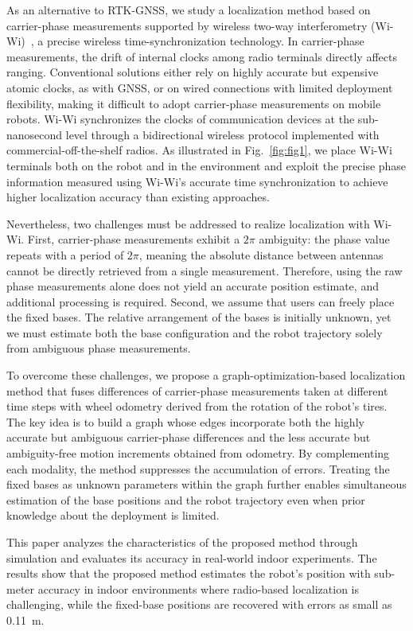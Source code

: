 \documentclass[conference]{IEEEtran}
\begin{document}
As an alternative to RTK-GNSS, we study a localization method based on carrier-phase measurements supported by wireless two-way interferometry (Wi-Wi)~\cite{Shiga2017,Yasuda2019}, a precise wireless time-synchronization technology.
In carrier-phase measurements, the drift of internal clocks among radio terminals directly affects ranging.
Conventional solutions either rely on highly accurate but expensive atomic clocks, as with GNSS, or on wired connections with limited deployment flexibility, making it difficult to adopt carrier-phase measurements on mobile robots.
Wi-Wi synchronizes the clocks of communication devices at the sub-nanosecond level through a bidirectional wireless protocol implemented with commercial-off-the-shelf radios.
As illustrated in Fig.~\ref{fig:fig1}, we place Wi-Wi terminals both on the robot and in the environment and exploit the precise phase information measured using Wi-Wi's accurate time synchronization to achieve higher localization accuracy than existing approaches.

Nevertheless, two challenges must be addressed to realize localization with Wi-Wi.
First, carrier-phase measurements exhibit a $2\pi$ ambiguity: the phase value repeats with a period of $2\pi$, meaning the absolute distance between antennas cannot be directly retrieved from a single measurement.
Therefore, using the raw phase measurements alone does not yield an accurate position estimate, and additional processing is required.
Second, we assume that users can freely place the fixed bases.
The relative arrangement of the bases is initially unknown, yet we must estimate both the base configuration and the robot trajectory solely from ambiguous phase measurements.

To overcome these challenges, we propose a graph-optimization-based localization method that fuses differences of carrier-phase measurements taken at different time steps with wheel odometry derived from the rotation of the robot's tires.
The key idea is to build a graph whose edges incorporate both the highly accurate but ambiguous carrier-phase differences and the less accurate but ambiguity-free motion increments obtained from odometry.
By complementing each modality, the method suppresses the accumulation of errors.
Treating the fixed bases as unknown parameters within the graph further enables simultaneous estimation of the base positions and the robot trajectory even when prior knowledge about the deployment is limited.

This paper analyzes the characteristics of the proposed method through simulation and evaluates its accuracy in real-world indoor experiments.
The results show that the proposed method estimates the robot's position with sub-meter accuracy in indoor environments where radio-based localization is challenging, while the fixed-base positions are recovered with errors as small as 0.11~m.
\end{document}
